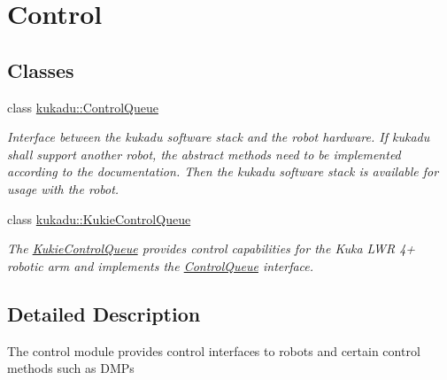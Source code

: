 \hypertarget{group__Control}{\section{Control}
\label{group__Control}
}
\subsection*{Classes}
\begin{DoxyCompactItemize}
\item 
class \hyperlink{classkukadu_1_1ControlQueue}{kukadu\-::\-Control\-Queue}
\begin{DoxyCompactList}\small\item\em Interface between the kukadu software stack and the robot hardware. If kukadu shall support another robot, the abstract methods need to be implemented according to the documentation. Then the kukadu software stack is available for usage with the robot. \end{DoxyCompactList}\item 
class \hyperlink{classkukadu_1_1KukieControlQueue}{kukadu\-::\-Kukie\-Control\-Queue}
\begin{DoxyCompactList}\small\item\em The \hyperlink{classkukadu_1_1KukieControlQueue}{Kukie\-Control\-Queue} provides control capabilities for the Kuka L\-W\-R 4+ robotic arm and implements the \hyperlink{classkukadu_1_1ControlQueue}{Control\-Queue} interface. \end{DoxyCompactList}\end{DoxyCompactItemize}


\subsection{Detailed Description}
The control module provides control interfaces to robots and certain control methods such as D\-M\-Ps 